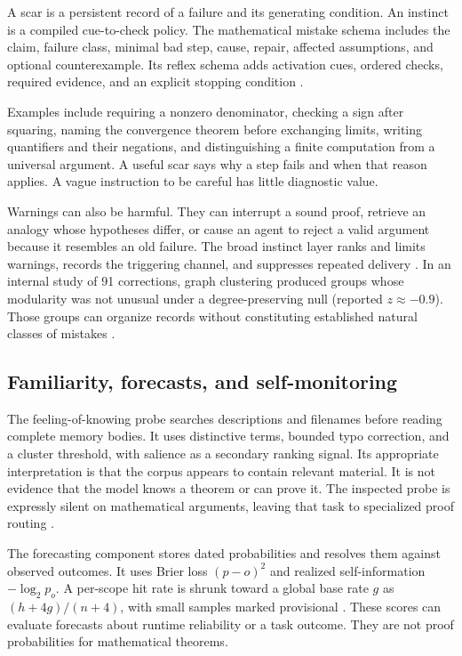 A scar is a persistent record of a failure and its generating condition. An instinct is a compiled cue-to-check policy. The mathematical mistake schema includes the claim, failure class, minimal bad step, cause, repair, affected assumptions, and optional counterexample. Its reflex schema adds activation cues, ordered checks, required evidence, and an explicit stopping condition \citep{mistakes,triggers}.

Examples include requiring a nonzero denominator, checking a sign after squaring, naming the convergence theorem before exchanging limits, writing quantifiers and their negations, and distinguishing a finite computation from a universal argument. A useful scar says why a step fails and when that reason applies. A vague instruction to be careful has little diagnostic value.

Warnings can also be harmful. They can interrupt a sound proof, retrieve an analogy whose hypotheses differ, or cause an agent to reject a valid argument because it resembles an old failure. The broad instinct layer ranks and limits warnings, records the triggering channel, and suppresses repeated delivery \citep{instincts}. In an internal study of 91 corrections, graph clustering produced groups whose modularity was not unusual under a degree-preserving null (reported $z\approx-0.9$). Those groups can organize records without constituting established natural classes of mistakes \citep{mistakegraph}.

\subsection{Familiarity, forecasts, and self-monitoring}

The feeling-of-knowing probe searches descriptions and filenames before reading complete memory bodies. It uses distinctive terms, bounded typo correction, and a cluster threshold, with salience as a secondary ranking signal. Its appropriate interpretation is that the corpus appears to contain relevant material. It is not evidence that the model knows a theorem or can prove it. The inspected probe is expressly silent on mathematical arguments, leaving that task to specialized proof routing \citep{fok}.

The forecasting component stores dated probabilities and resolves them against observed outcomes. It uses Brier loss $(p-o)^2$ and realized self-information $-\log_2 p_o$. A per-scope hit rate is shrunk toward a global base rate $g$ as $(h+4g)/(n+4)$, with small samples marked provisional \citep{prediction}. These scores can evaluate forecasts about runtime reliability or a task outcome. They are not proof probabilities for mathematical theorems.

